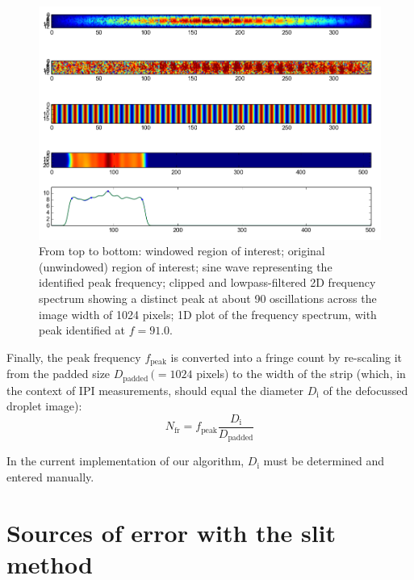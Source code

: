 \documentclass[10pt]{book}
\begin{document}
\begin{figure}[h]
    \centering
    \includegraphics[height=0.38\textheight]{img/globalsizing-dropletpeak.png}
    \caption{From top to bottom: windowed region of interest; original
    (unwindowed) region of interest; sine wave representing the identified peak
frequency; clipped and lowpass-filtered 2D frequency spectrum showing a distinct
peak at about 90 oscillations across the image width of 1024 pixels; 1D plot of
the frequency spectrum, with peak identified at $f=91.0$.}
    \label{fig:globalsizing-dropletpeak}
\end{figure}

Finally, the peak frequency $f_\text{peak}$ is converted into a fringe count by re-scaling it
from the padded size $D_\text{padded}\, (= 1024$ pixels) to the width of the strip (which, in the
context of IPI measurements, should equal the diameter $D_\text{i}$ of the defocussed droplet
image):
\begin{equation}
    N_\text{fr} = f_\text{peak} \frac{D_\text{i}}{D_\text{padded}}
    \label{fringes-from-diameter}
\end{equation}

In the current implementation of our algorithm, $D_\text{i}$ must be determined
and entered manually.

\section{Sources of error with the slit method}
\end{document}
